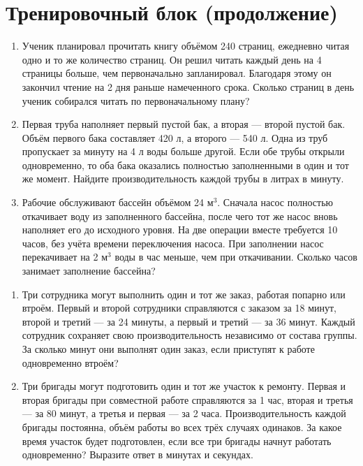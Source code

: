 \documentclass[a4paper,12pt]{article}
\newcommand{\example}[1]{\par\medskip{\color{darkaccent}\textbf{#1}}\par\smallskip}
\begin{document}
\section*{Тренировочный блок (продолжение)}
\example{Уровень выше среднего}
\begin{enumerate}[start=6]
\item Ученик планировал прочитать книгу объёмом 240 страниц, ежедневно читая одно и то же количество страниц. Он решил читать каждый день на 4 страницы больше, чем первоначально запланировал. Благодаря этому он закончил чтение на 2 дня раньше намеченного срока. Сколько страниц в день ученик собирался читать по первоначальному плану?
\item Первая труба наполняет первый пустой бак, а вторая --- второй пустой бак. Объём первого бака составляет 420 л, а второго --- 540 л. Одна из труб пропускает за минуту на 4 л воды больше другой. Если обе трубы открыли одновременно, то оба бака оказались полностью заполненными в один и тот же момент. Найдите производительность каждой трубы в литрах в минуту.
\item Рабочие обслуживают бассейн объёмом 24 м$^3$. Сначала насос полностью откачивает воду из заполненного бассейна, после чего тот же насос вновь наполняет его до исходного уровня. На две операции вместе требуется 10 часов, без учёта времени переключения насоса. При заполнении насос перекачивает на 2 м$^3$ воды в час меньше, чем при откачивании. Сколько часов занимает заполнение бассейна?
\end{enumerate}
\example{Сложный уровень}
\begin{enumerate}[start=9]
\item Три сотрудника могут выполнить один и тот же заказ, работая попарно или втроём. Первый и второй сотрудники справляются с заказом за 18 минут, второй и третий --- за 24 минуты, а первый и третий --- за 36 минут. Каждый сотрудник сохраняет свою производительность независимо от состава группы. За сколько минут они выполнят один заказ, если приступят к работе одновременно втроём?
\item Три бригады могут подготовить один и тот же участок к ремонту. Первая и вторая бригады при совместной работе справляются за 1 час, вторая и третья --- за 80 минут, а третья и первая --- за 2 часа. Производительность каждой бригады постоянна, объём работы во всех трёх случаях одинаков. За какое время участок будет подготовлен, если все три бригады начнут работать одновременно? Выразите ответ в минутах и секундах.
\end{enumerate}
\clearpage
\end{document}
